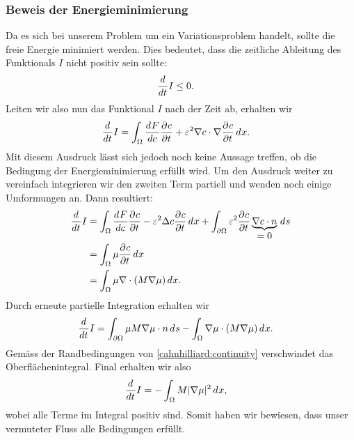 \subsubsection{Beweis der Energieminimierung}
Da es sich bei unserem Problem um ein Variationsproblem handelt,
sollte die freie Energie minimiert werden.
Dies bedeutet, dass die zeitliche Ableitung des Funktionals  $I$
nicht positiv sein sollte:
\begin{align*}
\frac{d^{}{}}{d{t^{}}} I
&\leq
0
.
\end{align*}
Leiten wir also nun das Funktional $I$ nach der Zeit ab,
erhalten wir
\begin{align*}
\frac{d^{}{}}{d{t^{}}} I
&=
\int_\Omega \frac{d^{}{F}}{d{c^{}}} \frac{\partial^{} c}{\partial t^{}}
+ \varepsilon^2 \nabla c \cdot \nabla \frac{\partial^{} c}{\partial t^{}} \,d^{}{x}
.
\end{align*}
Mit diesem Ausdruck lässt sich jedoch noch keine Aussage treffen,
ob die Bedingung der Energieminimierung erfüllt wird.
Um den Ausdruck weiter zu vereinfach integrieren wir den zweiten Term partiell
und wenden noch einige Umformungen an.
Dann resultiert:
\begin{align*}
\frac{d^{}{}}{d{t^{}}} I
&=
\int_\Omega \frac{d^{}{F}}{d{c^{}}} \frac{\partial^{} c}{\partial t^{}} - \varepsilon^2 \Delta c \frac{\partial^{} c}{\partial t^{}} \,d^{}{x}
+ \int_{\partial\Omega} \varepsilon^2 \frac{\partial^{} c}{\partial t^{}} \underbrace{\nabla c\cdot n}_{\displaystyle =0} \,d^{}{s}
\\
&=
\int_\Omega \mu \frac{\partial^{} c}{\partial t^{}} \,d^{}{x}
\\
&=
\int_\Omega \mu \nabla \cdot (M \nabla \mu) \,d^{}{x}
.
\end{align*}
Durch erneute partielle Integration erhalten wir
\begin{align*}
\frac{d^{}{}}{d{t^{}}} I
&=
\int_{\partial\Omega} \mu M \nabla \mu \cdot n \,d^{}{s} - \int_\Omega \nabla \mu \cdot (M \nabla \mu) \,d^{}{x}
.
\end{align*}
Gemäss der Randbedingungen von \eqref{cahnhilliard:continuity}
verschwindet das Oberflächenintegral.
Final erhalten wir also
\begin{align*}
\frac{d^{}{}}{d{t^{}}} I
&=
-\int_\Omega M |\nabla \mu|^2 \,d^{}{x}
,
\end{align*}
wobei alle Terme im Integral positiv sind.
Somit haben wir bewiesen,
dass unser vermuteter Fluss alle Bedingungen erfüllt.

